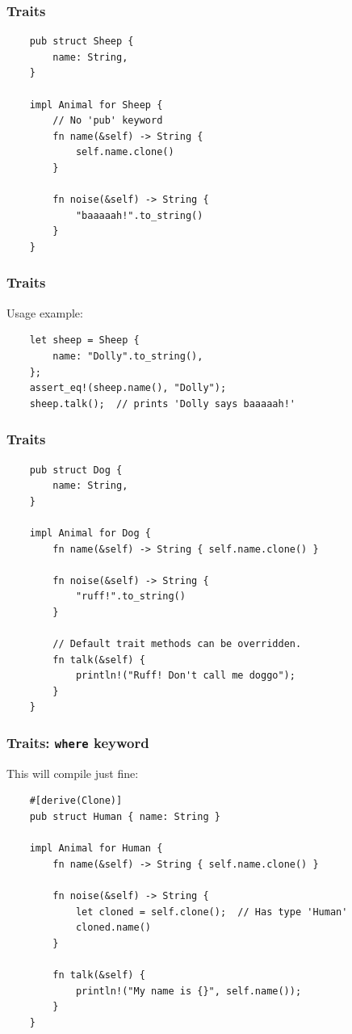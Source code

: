 \documentclass[aspectratio=1610,t]{beamer}
\begin{document}
\begin{frame}[fragile]
\frametitle{Traits}
\begin{verbatim}
    pub struct Sheep {
        name: String,
    }

    impl Animal for Sheep {
        // No 'pub' keyword
        fn name(&self) -> String {
            self.name.clone()
        }

        fn noise(&self) -> String {
            "baaaaah!".to_string()
        }
    }
\end{verbatim}
\end{frame}


\begin{frame}[fragile]
\frametitle{Traits}
Usage example:

\begin{verbatim}
    let sheep = Sheep {
        name: "Dolly".to_string(),
    };
    assert_eq!(sheep.name(), "Dolly");
    sheep.talk();  // prints 'Dolly says baaaaah!'
\end{verbatim}
\end{frame}


\begin{frame}[fragile]
\frametitle{Traits}
\begin{verbatim}
    pub struct Dog {
        name: String,
    }

    impl Animal for Dog {
        fn name(&self) -> String { self.name.clone() }

        fn noise(&self) -> String {
            "ruff!".to_string()
        }

        // Default trait methods can be overridden.
        fn talk(&self) {
            println!("Ruff! Don't call me doggo");
        }
    }
\end{verbatim}
\end{frame}


\begin{frame}[fragile]
\frametitle{Traits: \texttt{where} keyword}
This will compile just fine:

\begin{verbatim}
    #[derive(Clone)]
    pub struct Human { name: String }

    impl Animal for Human {
        fn name(&self) -> String { self.name.clone() }

        fn noise(&self) -> String {
            let cloned = self.clone();  // Has type 'Human'
            cloned.name()
        }
        
        fn talk(&self) {
            println!("My name is {}", self.name());
        }
    }
\end{verbatim}
\end{frame}
\end{document}
